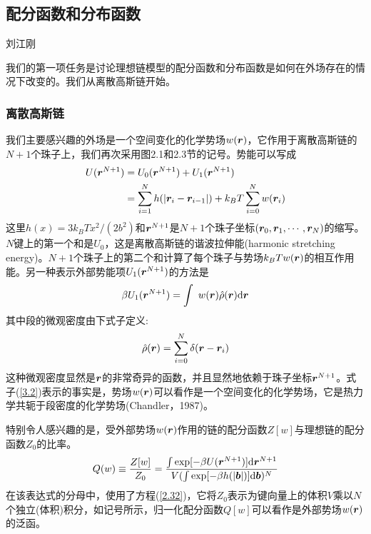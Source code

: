 \subsection{配分函数和分布函数}
\begin{center}
刘江刚
\end{center}
我们的第一项任务是讨论理想链模型的配分函数和分布函数是如何在外场存在的情况下改变的。我们从离散高斯链开始。
\subsubsection{离散高斯链}
我们主要感兴趣的外场是一个空间变化的化学势场$w(\bm{r})$，它作用于离散高斯链的$N+1$个珠子上，我们再次采用图2.1和2.3节的记号。势能可以写成
\begin{equation}\label{3.1}
\begin{aligned}
U(\bm{r}^{N+1})&=U_0(\bm{r}^{N+1})+U_1(\bm{r}^{N+1})\\
&=\sum\limits_{i=1}^Nh(\left|\bm{r}_i-\bm{r}_{i-1}\right|)+k_BT\sum\limits_{i=0}^Nw(\bm{r}_i)
\end{aligned}
\end{equation}
这里$h(x)=3k_BTx^2/(2b^2)$和$\bm{r}^{N+1}$是$N+1$个珠子坐标$(\bm{r}_0,\bm{r}_1,\cdots,\bm{r}_N)$的缩写。$N$键上的第一个和是$U_0$，这是离散高斯链的谐波拉伸能(harmonic stretching energy)。$N+1$个珠子上的第二个和计算了每个珠子与势场$k_BTw(\bm{r})$的相互作用能。另一种表示外部势能项$U_1(\bm{r}^{N+1})$的方法是
\begin{equation}\label{3.2}
\beta U_1(\bm{r}^{N+1})=\int~w(\bm{r})\hat{\rho}(\bm{r})\mathrm{d}\bm{r}
\end{equation}
其中段的微观密度由下式子定义:
\begin{equation}\label{3.3}
\hat{\rho}(\bm{r})=\sum\limits_{i=0}^N\delta(\bm{r}-\bm{r}_i)
\end{equation}
这种微观密度显然是$\bm{r}$的非常奇异的函数，并且显然地依赖于珠子坐标$\bm{r}^{N+1}$。式子(\ref{3.2})表示的事实是，势场$w(\bm{r})$可以看作是一个空间变化的化学势场，它是热力学共轭于段密度的化学势场(Chandler，1987)。

特别令人感兴趣的是，受外部势场$w(\bm{r})$作用的链的配分函数$Z[w]$与理想链的配分函数$Z_0$的比率。
\begin{equation}\label{3.4}
Q(w)\equiv\frac{Z[w]}{Z_0}=\frac{\int\exp[-\beta U(\bm{r}^{N+1})]\mathrm{d}\bm{r}^{N+1}}{V(\int\exp[-\beta h(\left|\bm{b}\right|)]\mathrm{d}\bm{b})^N}
\end{equation}
在该表达式的分母中，使用了方程(\ref{2.32})，它将$Z_0$表示为键向量上的体积$V$乘以$N$个独立(体积)积分，如记号所示，归一化配分函数$Q[w]$可以看作是外部势场$w(\bm{r})$的泛函。

